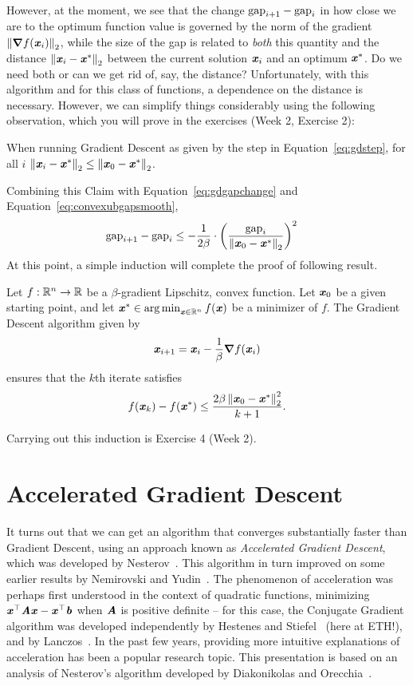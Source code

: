 However, at the moment, we see that the change $\gap_{i+1}- \gap_i$
in how close we are to the optimum function value is governed by the norm of the gradient $\norm{\grad
  f(\xx_{i})}_2$, while the size of the gap is related to \emph{both}
this quantity and the distance $\norm{\xx_i - \xx^*}_2$ between the
current solution $\xx_i$ and an optimum $\xx^*$.
Do we need both or can we get rid of, say, the distance?
Unfortunately, with this algorithm and for this class of functions, a
dependence on the distance is necessary.
However, we can simplify things considerably using the following
observation, which you will prove in the exercises (Week 2, Exercise 2):
\begin{claim}
  \label{clm:gdoptdist}
  When running Gradient Descent as given by the step in
  Equation~\eqref{eq:gdstep},  for all $i$
  $\norm{\xx_i - \xx^*}_2 \leq \norm{\xx_0 - \xx^*}_2$.
\end{claim}
Combining this Claim with Equation~\eqref{eq:gdgapchange} and Equation~\eqref{eq:convexubgapsmooth},
\begin{align}
\label{eq:convexgapsmooth}
  \gap_{i+1}- \gap_i
  &\leq
    -
    \frac{1}{2\beta}
    \cdot
    \left(
    \frac{\gap_i}{\norm{\xx_0 - \xx^*}_2 }
    \right)^2
\end{align}
At this point, a simple induction will complete the proof of following result.
\begin{theorem}
  \label{thm:gdsmoothconv}
  Let $f : \R^n \to \R$ be a $\beta$-gradient Lipschitz, convex
  function.
  Let $\xx_0$ be a given starting point,
  and let $\xx^* \in \argmin_{\xx \in \R^n} f(\xx)$ be a minimizer of $f$.
 The Gradient Descent algorithm given by
  \[
   \xx_{i+1} = \xx_{i} - \frac{1}{\beta} \grad f(\xx_{i})
 \]
 ensures that the $k$th iterate satisfies
 \[
   f(\xx_{k}) - f(\xx^*)\leq \frac{2\beta \norm{\xx_0 - \xx^*}_2^2}{k+1}
   .
   \]
\end{theorem}
Carrying out this induction is Exercise 4 (Week 2).

\section{Accelerated Gradient Descent}


It turns out that we can get an algorithm that converges substantially
faster than Gradient Descent, using an approach known as
\emph{Accelerated Gradient Descent}, which was developed by
Nesterov~\cite{n83}.
This algorithm in turn improved on some earlier results by Nemirovski and Yudin~\cite{ny83}.
The phenomenon of acceleration was perhaps first understood in the context of
quadratic functions, minimizing $\xx^\trp \AA \xx - \xx^\trp \bb$
when $\AA$ is positive definite -- for this case, the Conjugate
Gradient algorithm was developed independently by Hestenes and
Stiefel~\cite{hs52} (here at ETH!), and by Lanczos~\cite{l52}.
In the past few years, providing more intuitive explanations of
acceleration has been a popular research topic.
This presentation is based on an analysis of Nesterov's algorithm
developed by Diakonikolas and Orecchia~\cite{do19}.

